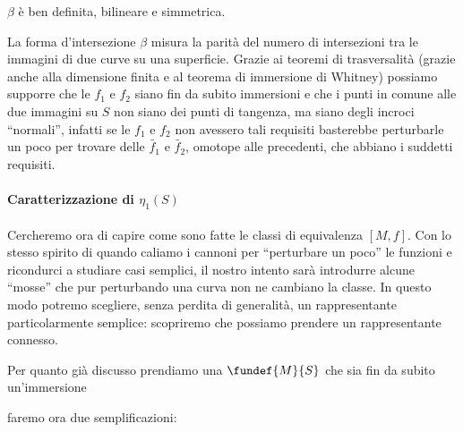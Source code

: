 \begin{ex}
	$\beta$ è ben definita, bilineare e simmetrica.
\end{ex}

La forma d'intersezione $\beta$ misura la parità del numero di intersezioni tra le immagini di due curve su una superficie. Grazie ai teoremi di trasversalità (grazie anche alla dimensione finita e al teorema di immersione di Whitney) possiamo supporre che le $f_1$ e $f_2$ siano fin da subito immersioni e che i punti in comune alle due immagini su $S$ non siano dei punti di tangenza, ma siano degli incroci ``normali'', infatti se le $f_1$ e $f_2$ non avessero tali requisiti basterebbe perturbarle un poco per trovare delle $\tilde{f_1}$ e $\tilde{f_2}$, omotope alle precedenti, che abbiano i suddetti requisiti.

\paragraph{Caratterizzazione di $\eta_1(S)$}
Cercheremo ora di capire come sono fatte le classi di equivalenza $[M,f]$. Con lo stesso spirito di quando caliamo i cannoni per ``perturbare un poco'' le funzioni e ricondurci a studiare casi semplici, il nostro intento sarà introdurre alcune ``mosse'' che pur perturbando una curva non ne cambiano la classe. In questo modo potremo scegliere, senza perdita di generalità, un rappresentante particolarmente semplice: scopriremo che possiamo prendere un rappresentante connesso.

Per quanto già discusso prendiamo una $\fundef{M}{S}$ che sia fin da subito un'immersione
\begin{center}
  
\end{center}
faremo ora due semplificazioni:

